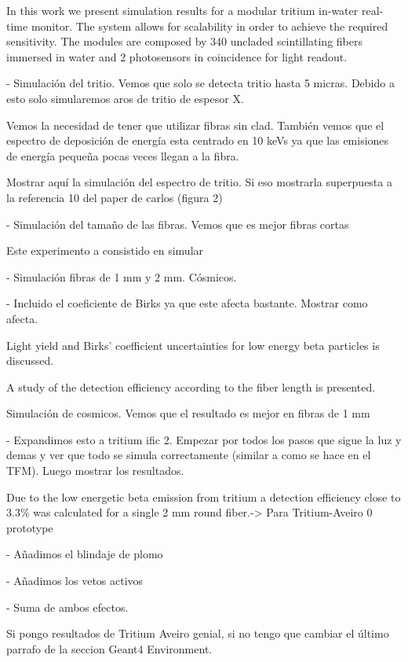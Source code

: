 In this work we present simulation results for a modular tritium in-water real-time monitor. The system allows for scalability in order to achieve the required sensitivity. The modules are composed by 340 uncladed scintillating fibers immersed in water and 2 photosensors in coincidence for light readout.

- Simulación del tritio. Vemos que solo se detecta tritio hasta 5 micras. 
Debido a esto solo simularemos aros de tritio de espesor X.

Vemos la necesidad de tener que utilizar fibras sin clad. También vemos que el espectro de deposición de energía esta centrado en 10 keVs ya que las emisiones de energía pequeña pocas veces llegan a la fibra.

Mostrar aquí la simulación del espectro de tritio. Si eso mostrarla superpuesta a la referencia 10 del paper de carlos (figura 2)

- Simulación del tamaño de las fibras. Vemos que es mejor fibras cortas 

Este experimento a consistido en simular


- Simulación fibras de 1 mm y 2 mm. Cósmicos.

- Incluido el coeficiente de Birks ya que este afecta bastante. Mostrar como afecta.

 Light yield and Birks’ coefficient uncertainties for low energy beta particles is discussed.
 
  A study of the detection efficiency according to the fiber length is presented.

Simulación de cosmicos. Vemos que el resultado es mejor en fibras de 1 mm

- Expandimos esto a tritium ific 2. 
Empezar por todos los pasos que sigue la luz y demas y ver que todo se simula correctamente (similar a como se hace en el TFM). Luego mostrar los resultados.

Due to the low energetic beta emission from tritium a detection efficiency close to 3.3\% was calculated for a single 2 mm round fiber.-> Para Tritium-Aveiro 0 prototype

- Añadimos el blindaje de plomo

- Añadimos los vetos activos

- Suma de ambos efectos.

Si pongo resultados de Tritium Aveiro genial, si no tengo que cambiar el último parrafo de la seccion Geant4 Environment.